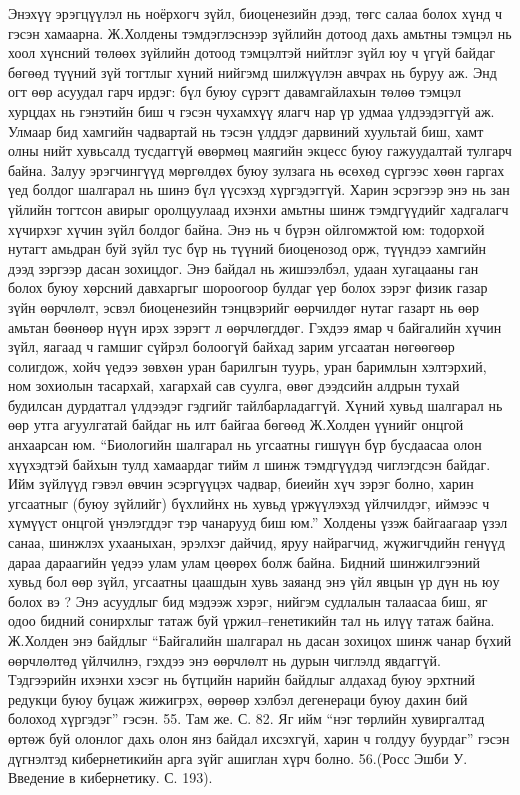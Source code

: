 Энэхүү эрэгцүүлэл нь ноёрхогч зүйл, биоценезийн дээд, төгс салаа болох хүнд ч гэсэн хамаарна. Ж.Холдены тэмдэглэснээр зүйлийн дотоод дахь амьтны тэмцэл нь хоол хүнсний төлөөх зүйлийн дотоод тэмцэлтэй нийтлэг зүйл юу ч үгүй байдаг бөгөөд түүний зүй тогтлыг хүний нийгэмд шилжүүлэн авчрах нь буруу аж. Энд огт өөр асуудал гарч ирдэг: бүл буюу сүрэгт давамгайлахын төлөө тэмцэл хурцдах нь гэнэтийн биш ч гэсэн чухамхүү ялагч нар үр удмаа үлдээдэггүй аж. Улмаар бид хамгийн чадвартай нь тэсэн үлддэг дарвиний хуультай биш, хамт олны нийт хувьсалд тусдаггүй өвөрмөц маягийн экцесс буюу гажуудалтай тулгарч байна. Залуу эрэгчингүүд мөргөлдөх буюу зулзага нь өсөхөд сүргээс хөөн гаргах үед болдог шалгарал нь шинэ бүл үүсэхэд хүргэдэггүй. Харин эсрэгээр энэ нь зан үйлийн тогтсон авирыг оролцуулаад ихэнхи амьтны шинж тэмдгүүдийг хадгалагч хүчирхэг хүчин зүйл болдог байна. Энэ нь ч бүрэн ойлгомжтой юм: тодорхой нутагт амьдран буй зүйл тус бүр нь түүний биоценозод орж, түүндээ хамгийн дээд зэргээр дасан зохицдог. Энэ байдал нь жишээлбэл, удаан хугацааны ган болох буюу хөрсний давхаргыг шороогоор булдаг үер болох зэрэг физик газар зүйн өөрчлөлт, эсвэл биоценезийн тэнцвэрийг өөрчилдөг нутаг газарт нь өөр амьтан бөөнөөр нүүн ирэх зэрэгт л өөрчлөгддөг.
Гэхдээ ямар ч байгалийн хүчин зүйл, яагаад ч гамшиг сүйрэл болоогүй байхад зарим угсаатан нөгөөгөөр солигдож, хойч үедээ зөвхөн уран барилгын туурь, уран баримлын хэлтэрхий, ном зохиолын тасархай, хагархай сав суулга, өвөг дээдсийн алдрын тухай будилсан дурдатгал үлдээдэг гэдгийг тайлбарладаггүй. Хүний хувьд шалгарал нь өөр утга агуулгатай байдаг нь илт байгаа бөгөөд Ж.Холден үүнийг онцгой анхаарсан юм. “Биологийн шалгарал нь угсаатны гишүүн бүр бусдаасаа олон хүүхэдтэй байхын тулд хамаардаг тийм л шинж тэмдгүүдэд чиглэгдсэн байдаг. Ийм зүйлүүд гэвэл өвчин эсэргүүцэх чадвар, биеийн хүч зэрэг болно, харин угсаатныг (буюу зүйлийг) бүхлийнх нь хувьд үржүүлэхэд үйлчилдэг, иймээс ч хүмүүст онцгой үнэлэгддэг тэр чанарууд биш юм.” Холдены үзэж байгаагаар үзэл санаа, шинжлэх ухааныхан, эрэлхэг дайчид, яруу найрагчид, жүжигчдийн генүүд дараа дараагийн үедээ улам улам цөөрөх болж байна. Бидний шинжилгээний хувьд бол өөр зүйл, угсаатны цаашдын хувь заяанд энэ үйл явцын үр дүн нь юу болох вэ ? Энэ асуудлыг бид мэдээж хэрэг, нийгэм судлалын талаасаа биш, яг одоо бидний сонирхлыг татаж буй үржил–генетикийн тал нь илүү татаж байна. Ж.Холден энэ байдлыг “Байгалийн шалгарал нь дасан зохицох шинж чанар бүхий өөрчлөлтөд үйлчилнэ, гэхдээ энэ өөрчлөлт нь дурын чиглэлд явдаггүй. Тэдгээрийн ихэнхи хэсэг нь бүтцийн нарийн байдлыг алдахад буюу эрхтний редукци буюу буцаж жижигрэх, өөрөөр хэлбэл дегенераци буюу дахин бий болоход хүргэдэг” гэсэн. 55. Там же. С. 82. Яг ийм “нэг төрлийн хувиргалтад өртөж буй олонлог дахь олон янз байдал ихсэхгүй, харин ч голдуу буурдаг” гэсэн дүгнэлтэд кибернетикийн арга зүйг ашиглан хүрч болно. 56.(Росс Эшби У. Введение в кибернетику. С. 193).
